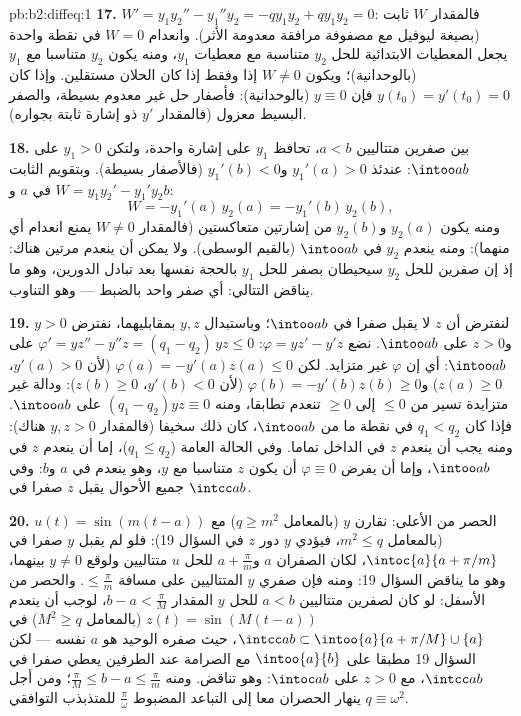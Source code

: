 \begin{solution}{pb:b2:diffeq:1}
\textbf{17.} $W' = y_1y_2'' - y_1''y_2 = -qy_1y_2 + qy_1y_2 =
0$: فالمقدار $W$ ثابت (بصيغة ليوفيل مع مصفوفة
مرافقة معدومة الأثر). وانعدام $W = 0$ في نقطة واحدة يجعل المعطيات
الابتدائية للحل $y_2$ متناسبة مع معطيات $y_1$، ومنه يكون $y_2$
متناسبا مع $y_1$ (بالوحدانية)؛ ويكون $W \neq 0$ إذا وفقط إذا كان
الحلان مستقلين. وإذا كان $y(t_0) =
y'(t_0) = 0$ فإن $y \equiv 0$ (بالوحدانية): فأصفار حل
غير معدوم بسيطة، والصفر البسيط معزول (فالمقدار $y'$ ذو إشارة
ثابتة بجواره).

\textbf{18.} بين صفرين متتاليين $a < b$، تحافظ $y_1$ على إشارة
واحدة، ولتكن $y_1 > 0$ على $\intoo ab$: عندئذ $y_1'(a) > 0$ و$y_1'(b) < 0$ (فالأصفار
بسيطة). وبتقويم الثابت $W =
y_1y_2' - y_1'y_2$ في $a$ و$b$:
\[
W = -y_1'(a)\,y_2(a) = -y_1'(b)\,y_2(b) ,
\]
ومنه يكون $y_2(a)$ و$y_2(b)$ من إشارتين متعاكستين (فالمقدار $W \neq 0$ يمنع
انعدام أي منهما): ومنه ينعدم $y_2$ في $\intoo ab$ (بالقيم الوسطى).
ولا يمكن أن ينعدم مرتين هناك: إذ إن صفرين للحل $y_2$ سيحيطان بصفر
للحل $y_1$ بالحجة نفسها بعد تبادل الدورين، وهو ما يناقض التتالي:
أي صفر واحد بالضبط --- وهو التناوب.

\textbf{19.} لنفترض أن $z$ لا يقبل صفرا في $\intoo ab$؛ وباستبدال
$y, z$ بمقابليهما، نفترض $y > 0$ و$z > 0$ على $\intoo ab$. نضع $\varphi = yz' - y'z$:
$\varphi' = yz'' -
y''z = (q_1 - q_2)\,yz \leq 0$ على $\intoo ab$: أي إن $\varphi$ غير متزايد. لكن $\varphi(a) = -y'(a)z(a) \leq 0$ (لأن $y'(a) > 0$،
$z(a) \geq 0$) و$\varphi(b) = -y'(b)z(b) \geq
0$ (لأن $y'(b) < 0$، $z(b) \geq 0$): ودالة غير متزايدة تسير من
$\leq 0$ إلى $\geq 0$ تنعدم تطابقا، ومنه $(q_1 - q_2)yz \equiv 0$ على $\intoo ab$. فإذا كان
$q_1 < q_2$ في نقطة ما من $\intoo ab$، كان ذلك سخيفا (فالمقدار $y, z > 0$ هناك):
ومنه يجب أن ينعدم $z$ في الداخل تماما. وفي الحالة العامة
($q_1 \leq q_2$)، إما أن ينعدم $z$ في $\intoo ab$، وإما أن يفرض $\varphi \equiv 0$ أن
يكون $z$ متناسبا مع $y$، وهو ينعدم في $a$ و$b$: وفي
جميع الأحوال يقبل $z$ صفرا في $\intcc ab$.

\textbf{20.} الحصر من الأعلى: نقارن $y$ (بالمعامل $q \geq
m^2$) مع
$u(t) = \sin(m(t - a))$ (بالمعامل $m^2 \leq q$، فيؤدي $y$ دور $z$ في السؤال 19):
فلو لم يقبل $y$ صفرا في $\intoc{a}{a + \pi/m}$، لكان الصفران $a$ و$a +
\frac\pi m$ للحل
$u$ متتاليين ولوقع $y \neq 0$ بينهما، وهو ما يناقض السؤال 19: ومنه
فإن صفري $y$ المتتاليين على مسافة $\leq \frac\pi m$. والحصر من الأسفل: لو
كان لصفرين متتاليين $a < b$ للحل $y$ المقدار $b - a < \frac\pi M$، لوجب أن
ينعدم $z(t) = \sin(M(t-a))$ (بالمعامل $M^2 \geq q$) في $\intcc ab \subset \intoo{a}{a + \pi/M}
\cup\{a\}$، حيث صفره الوحيد هو $a$
نفسه --- لكن السؤال 19 مطبقا على $\intoo{a}{b}$ مع الصرامة عند الطرفين يعطي
صفرا في $\intcc ab$، مع $z > 0$ على $\intoc ab$: وهو تناقض. ومنه $\frac\pi M \leq b - a \leq
\frac\pi m$؛ ومن
أجل $q \equiv \omega^2$ ينهار الحصران معا إلى التباعد المضبوط $\frac\pi\omega$ للمتذبذب
التوافقي.


\end{solution}
